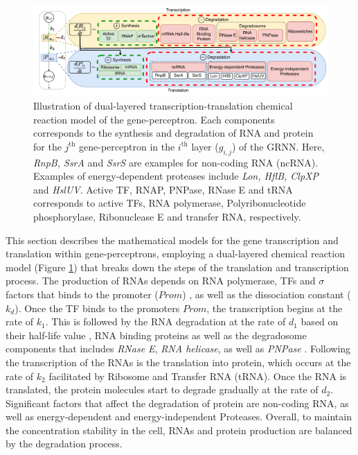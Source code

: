 \documentclass[twocolumn]{biophys-new}
\begin{document}
{{\begin{figure}[t!] %
\centering
\includegraphics[width=0.8\linewidth]{figures/trans_omic.pdf}
\caption{Illustration of dual-layered transcription-translation chemical reaction model of the gene-perceptron. Each components corresponds to the synthesis and degradation of RNA and protein for the  $j^{\text{th}}$ gene-perceptron in the $i^{\text{th}}$ layer ($g_{i,j}$) of the GRNN. Here, \emph{RnpB, SsrA} and \emph{SsrS} are examples for non-coding RNA (ncRNA). Examples of energy-dependent proteases include \emph{Lon, HflB, ClpXP} and \emph{HslUV}. Active TF, RNAP, PNPase, RNase E and tRNA corresponds to  active TFs, RNA polymerase,  Polyribonucleotide phosphorylase, Ribonuclease E and transfer RNA, respectively.  }
\label{trans_omic}
\vspace{-0.6em}
\end{figure}

This section describes the mathematical models for the gene transcription and translation within gene-perceptrons, employing  a dual-layered chemical reaction model (Figure \ref{trans_omic}) that breaks down the steps of the translation and transcription process. 
The production of RNAs depends on RNA polymerase, TFs and $\sigma$ factors that binds to the promoter ($Prom$) \cite{wang2021direct}, as well as the dissociation constant ($k_d$). Once the TF binds to the promoters $Prom$, the transcription begins at the rate of $k_1$. This is followed by the RNA degradation at the rate of $d_1$ based on their half-life value \cite{bernstein2002global}, RNA binding proteins \cite{holmqvist2018rna} as well as the degradosome components that includes \emph{RNase E}, \emph{RNA helicase}, as well as \emph{PNPase} \cite{tejada2020bacterial}. Following the transcription of the RNAs is the translation into protein, which occurs at the rate of $k_2$ facilitated by Ribosome and Transfer RNA (tRNA). Once the RNA is translated, the protein molecules start to degrade gradually at the rate of $d_2$. Significant factors that affect the degradation of protein are non-coding RNA, as well as energy-dependent and energy-independent Proteases. Overall, to maintain the concentration stability in the cell, RNAs and protein production are balanced by the degradation process.

}}
\end{document}
